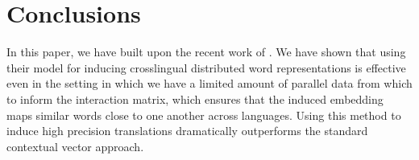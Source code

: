 \documentclass[11pt]{article}
\begin{document}
\section{Conclusions} \label{sect:conclusions}

In this paper, we have built upon the recent work of .
We have shown that using their model for inducing crosslingual distributed word representations is effective even in the setting in which we have a limited amount of parallel data from which to inform the interaction matrix, which ensures that the induced embedding maps similar words close to one another across languages. 
Using this method to induce high precision translations dramatically outperforms the standard contextual vector approach.




\end{document}
